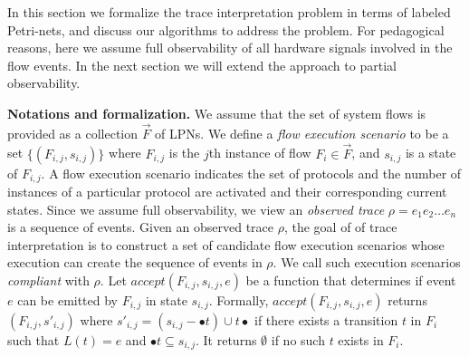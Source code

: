 \documentclass[conference]{IEEEtran}
\begin{document}
In this section we formalize the trace interpretation
problem in terms of labeled Petri-nets, and discuss our
algorithms to address the problem.  For pedagogical reasons,
here we assume full observability of all hardware signals
involved in the flow events.  In the next section we will
extend the approach to partial observability.

\medskip

\noindent 
{\bf Notations and formalization.}  We assume that the set
of system flows is provided as a collection ${\vec{F}}$ of
LPNs.  We define a {\em flow execution scenario} to be a
set $\{(F_{i,j}, s_{i,j})\}$ where $F_{i,j}$ is the
$j$th instance of flow $F_i \in {\vec{F}}$, and $s_{i,j}$ is
a state of $F_{i,j}$.  A flow execution scenario indicates
the set of protocols and the number of instances of a
particular protocol are activated and their corresponding
current states.  Since we assume full observability, we view
an {\em observed trace} $\rho = e_1e_2\ldots e_n$ is a
sequence of events.  Given an observed trace $\rho$, the
goal of of trace interpretation is to construct a set of
candidate flow execution scenarios whose execution can
create the sequence of events in $\rho$.  We call such
execution scenarios {\em compliant} with $\rho$.  Let
$\mathit{accept(F_{i,j}, s_{i,j}, e)}$ be a function that
determines if event $e$ can be emitted by $F_{i,j}$ in state
$s_{i,j}$.  Formally, $\mathit{accept(F_{i,j}, s_{i,j}, e)}$
returns $(F_{i,j}, s'_{i,j})$ where $s'_{i,j} = (s_{i,j} - \bullet t)
\cup t\bullet$ if there exists a transition
$t$ in $F_i$ such that $L(t) = e$ and $\bullet t \subseteq
s_{i,j}$.  It returns $\emptyset$ if no such $t$
exists in $F_i$.

\medskip
\end{document}

